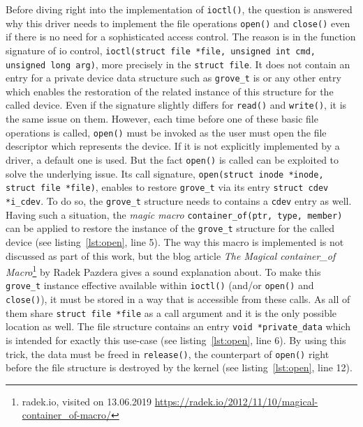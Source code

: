 Before diving right into the implementation of \texttt{ioctl()}, the question is answered why this driver needs to implement the file operations \texttt{open()} and \texttt{close()} even if there is no need for a sophisticated access control.
The reason is in the function signature of \ac{io} control, \texttt{ioctl(struct file *file, unsigned int cmd, unsigned long arg)}, more precisely in the \texttt{struct file}.
It does not contain an entry for a private device data structure such as \texttt{grove_t} is or any other entry which enables the restoration of the related instance of this structure for the called device.
Even if the signature slightly differs for \texttt{read()} and \texttt{write()}, it is the same issue on them.
However, each time before one of these basic file operations is called, \texttt{open()} must be invoked as the user must open the file descriptor which represents the device.
If it is not explicitly implemented by a driver, a default one is used.
But the fact \texttt{open()} is called can be exploited to solve the underlying issue.
Its call signature, \texttt{open(struct inode *inode, struct file *file)}, enables to restore \texttt{grove\_t} via its entry \texttt{struct cdev *i\_cdev}.
To do so, the \texttt{grove\_t} structure needs to contains a \texttt{cdev} entry as well.
Having such a situation, the \textit{magic macro} \texttt{container\_of(ptr, type, member)} can be applied to restore the instance of the \texttt{grove\_t} structure for the called device (see listing~\ref{lst:open}, line 5).
The way this macro is implemented is not discussed as part of this work, but the blog article \textit{The Magical container\_of Macro}\footnote{radek.io, visited on 13.06.2019 \url{https://radek.io/2012/11/10/magical-container_of-macro/}} by Radek Pazdera gives a sound explanation about.
To make this \texttt{grove\_t} instance effective available within \texttt{ioctl()} (and/or \texttt{open()} and \texttt{close()}), it must be stored in a way that is accessible from these calls.
As all of them share \texttt{struct file *file} as a call argument and it is the only possible location as well.
The file structure contains an entry \texttt{void *private_data} which is intended for exactly this use-case (see listing~\ref{lst:open}, line 6). 
By using this trick, the data must be freed in \texttt{release()}, the counterpart of \texttt{open()} right before the file structure is destroyed by the kernel (see listing~\ref{lst:open}, line 12).

